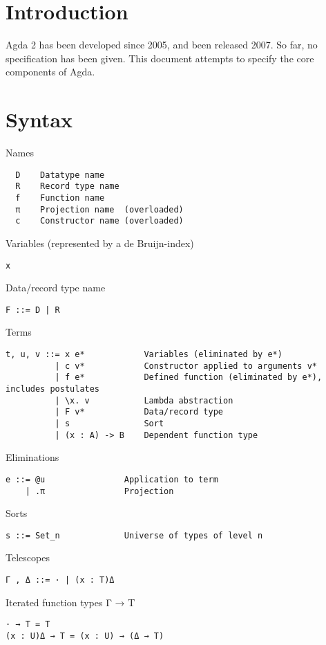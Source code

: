 \documentclass[acmlarge]{acmart}\settopmatter{}
\begin{document}
\section{Introduction}

Agda 2 has been developed since 2005, and been released 2007.  So far,
no specification has been given.  This document attempts to specify
the core components of Agda.


\section{Syntax}
\label{sec:syntax}

Names
\begin{verbatim}
  D    Datatype name
  R    Record type name
  f    Function name
  π    Projection name  (overloaded)
  c    Constructor name (overloaded)
\end{verbatim}

Variables (represented by a de Bruijn-index)
\begin{verbatim}
x
\end{verbatim}

Data/record type name
\begin{verbatim}
F ::= D | R
\end{verbatim}

Terms
\begin{verbatim}
t, u, v ::= x e*            Variables (eliminated by e*)
          | c v*            Constructor applied to arguments v*
          | f e*            Defined function (eliminated by e*), includes postulates
          | \x. v           Lambda abstraction
          | F v*            Data/record type
          | s               Sort
          | (x : A) -> B    Dependent function type
\end{verbatim}

Eliminations
\begin{verbatim}
e ::= @u                Application to term
    | .π                Projection
\end{verbatim}

Sorts
\begin{verbatim}
s ::= Set_n             Universe of types of level n
\end{verbatim}

Telescopes
\begin{verbatim}
Γ , Δ ::= · | (x : T)Δ
\end{verbatim}

Iterated function types Γ → T
\begin{verbatim}
· → T = T
(x : U)Δ → T = (x : U) → (Δ → T)
\end{verbatim}
\end{document}
